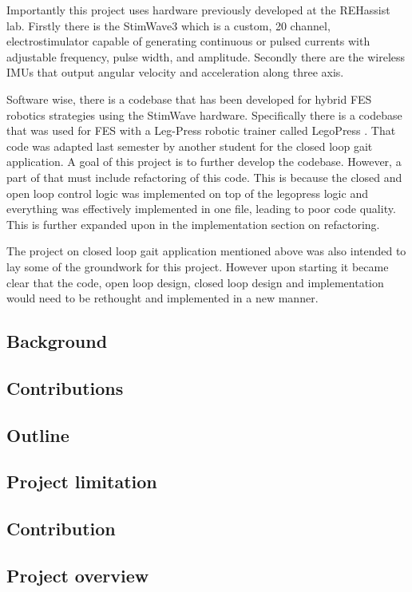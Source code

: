 Importantly this project uses hardware previously developed at the REHassist lab. Firstly there is the StimWave3 which is a custom, 20 channel, electrostimulator capable of generating continuous or pulsed currents with adjustable frequency, pulse width, and amplitude. Secondly there are the wireless IMUs that output angular velocity and acceleration along three axis. 

Software wise, there is a codebase that has been developed for hybrid FES robotics strategies using the StimWave hardware. Specifically there is a codebase that was used for FES with a Leg-Press robotic trainer called LegoPress \cite{olivier_legopress_2014}. That code was adapted last semester by another student for the closed loop gait application. A goal of this project is to further develop the codebase. However, a part of that must include refactoring of this code. This is because the closed and open loop control logic was implemented on top of the legopress logic and everything was effectively implemented in one file, leading to poor code quality. This is further expanded upon in the implementation section on refactoring.

The project on closed loop gait application mentioned above was also intended to lay some of the groundwork for this project. However upon starting it became clear that the code, open loop design, closed loop design and implementation would need to be rethought and implemented in a new manner.

\subsection{Background}

\subsection{Contributions}

\subsection{Outline}




\subsection{Project limitation}

\subsection{Contribution}

\subsection{Project overview}




